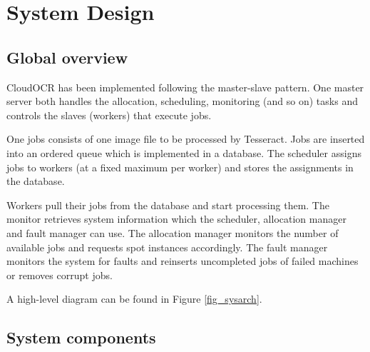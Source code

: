 \documentclass[a4paper]{IEEEtran}
\begin{document}
\section{System Design}
\label{sec:systemdesign}

\subsection*{Global overview}

CloudOCR has been implemented following the master-slave pattern. One master server both handles the allocation, scheduling, monitoring (and so on) tasks and controls the slaves (workers) that execute jobs.

One jobs consists of one image file to be processed by Tesseract. Jobs are inserted into an ordered queue which is implemented in a database. The scheduler assigns jobs to workers (at a fixed maximum per worker) and stores the assignments in the database.

Workers pull their jobs from the database and start processing them. The monitor retrieves system information which the scheduler, allocation manager and fault manager can use. The allocation manager monitors the number of available jobs and requests spot instances accordingly. The fault manager monitors the system for faults and reinserts uncompleted jobs of failed machines or removes corrupt jobs.

A high-level diagram can be found in Figure \ref{fig_sysarch}.

\subsection*{System components}
\end{document}
